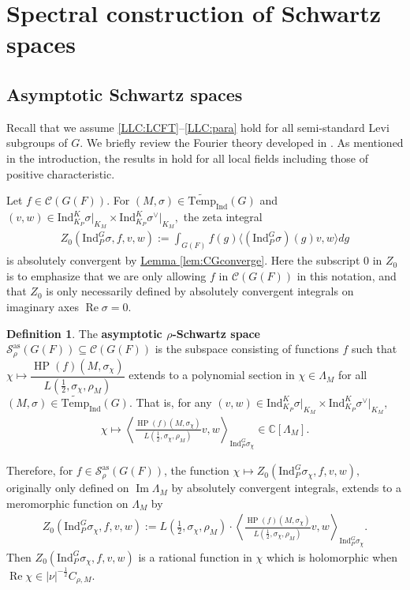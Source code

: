 \documentclass[10pt]{amsart}
\theoremstyle{definition}
\newtheorem{definition}[theorem]{Definition}
\numberwithin{equation}{section}
\numberwithin{equation}{subsection}
\newcommand{\Ind}{\mathrm{Ind}}
\newcommand{\CC}{\mathbb{C}}
\newcommand{\Temp}{\mathrm{Temp}}
\renewcommand{\Im}{\mathop{\mathrm{Im}}}
\renewcommand{\Re}{\mathop{\mathrm{Re}}}
\newcommand{\HP}{\mathop{\mathrm{HP}}\nolimits}
\begin{document}
\section{Spectral construction of Schwartz spaces }\label{sec:Schwartz:spectral}

\subsection{Asymptotic Schwartz spaces}\label{ssec:ass}  Recall that we assume \eqref{LLC:LCFT}--\eqref{LLC:para} hold for all semi-standard Levi subgroups of $G$. We briefly review the Fourier theory developed in \cite[\S4 and \S5]{DRS}. As mentioned in the introduction, the results   in \cite{DRS} hold for all local fields including those of positive characteristic. 


Let $f\in \mathcal{C}(G(F)).$ For $(M,\sigma)\in\widetilde{\Temp}_\Ind(G)$ and $(v,w)\in \Ind_{K_P}^K\sigma\vert_{K_M}\times \Ind_{K_P}^K\sigma^\vee\vert_{K_M},$ the zeta integral
\begin{align*}
     Z_0(\Ind_P^G\sigma,f,v,w):=\int_{G(F)} f(g)\langle (\Ind_P^G\sigma)(g)v,w \rangle dg
\end{align*}
is absolutely convergent by \hyperref[lem:CGconverge]{Lemma \ref{lem:CGconverge}}. Here the subscript $0$ in $Z_0$ is to emphasize that we are only allowing $f$ in $\mathcal{C}(G(F))$ in this notation, and that $Z_0$ is only necessarily defined by absolutely convergent integrals on imaginary axes $\Re \sigma=0$.


\begin{definition}  The \textbf{asymptotic $\rho$-Schwartz space} $\mathcal{S}_\rho^{\mathrm{as}}(G(F))\subseteq \mathcal{C}(G(F))$ is the subspace consisting of functions $f$ such that $\chi\mapsto \dfrac{\HP(f)(M,\sigma_\chi)}{L(\tfrac{1}{2},\sigma_\chi,\rho_M)}$ extends to a polynomial section in $\chi\in\Lambda_M$ for all $(M,\sigma)\in\widetilde{\Temp}_\Ind(G)$. That is, for any $(v,w)\in \Ind_{K_P}^K\sigma\vert_{K_M}\times \Ind_{K_P}^K\sigma^\vee\vert_{K_M},$
\begin{align*}
    \chi\mapsto \left\langle\frac{\HP(f)(M,\sigma_\chi)}{L(\tfrac{1}{2},\sigma_\chi,\rho_M)}v,w\right\rangle_{\Ind_P^G\sigma_\chi}\in \CC[\Lambda_M].
\end{align*}
\end{definition}

Therefore, for $f\in \mathcal{S}_\rho^{\mathrm{as}}(G(F))$, the function $\chi\mapsto Z_0(\Ind_P^G\sigma_\chi,f,v,w),$ originally only defined on $\Im\Lambda_{M}$ by absolutely convergent integrals, extends to a meromorphic function on $\Lambda_M$ by
\begin{align*}
    Z_0(\Ind_P^G\sigma_\chi,f,v,w) := L(\tfrac{1}{2},\sigma_\chi,\rho_M)\cdot\left\langle\frac{\HP(f)(M,\sigma_\chi)}{L(\tfrac{1}{2},\sigma_\chi,\rho_M)}v,w\right\rangle_{\Ind_P^G\sigma_\chi}.
\end{align*}
Then $Z_0(\Ind_P^G\sigma_\chi,f,v,w)$ is a rational function in $\chi$ which is holomorphic when $\Re\chi\in |\nu|^{-\frac{1}{2}}C_{\rho,M}$.
\end{document}
